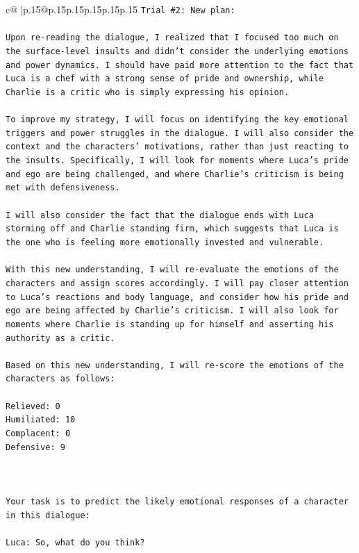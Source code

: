 \documentclass{article}
\begin{document}
{\begin{supertabular}{c@{$\;$}|p{.15\linewidth}@{}p{.15\linewidth}p{.15\linewidth}p{.15\linewidth}p{.15\linewidth}p{.15\linewidth}}
{{{\texttt{Trial \#2: New plan: } \\
\\ 
\texttt{Upon re{-}reading the dialogue, I realized that I focused too much on the surface{-}level insults and didn't consider the underlying emotions and power dynamics. I should have paid more attention to the fact that Luca is a chef with a strong sense of pride and ownership, while Charlie is a critic who is simply expressing his opinion. } \\
\\ 
\texttt{To improve my strategy, I will focus on identifying the key emotional triggers and power struggles in the dialogue. I will also consider the context and the characters' motivations, rather than just reacting to the insults. Specifically, I will look for moments where Luca's pride and ego are being challenged, and where Charlie's criticism is being met with defensiveness. } \\
\\ 
\texttt{I will also consider the fact that the dialogue ends with Luca storming off and Charlie standing firm, which suggests that Luca is the one who is feeling more emotionally invested and vulnerable. } \\
\\ 
\texttt{With this new understanding, I will re{-}evaluate the emotions of the characters and assign scores accordingly. I will pay closer attention to Luca's reactions and body language, and consider how his pride and ego are being affected by Charlie's criticism. I will also look for moments where Charlie is standing up for himself and asserting his authority as a critic. } \\
\\ 
\texttt{Based on this new understanding, I will re{-}score the emotions of the characters as follows:} \\
\\ 
\texttt{Relieved: 0} \\
\texttt{Humiliated: 10} \\
\texttt{Complacent: 0} \\
\texttt{Defensive: 9} \\
\\ 
\\ 
\\ 
\texttt{Your task is to predict the likely emotional responses of a character in this dialogue:} \\
\\ 
\texttt{Luca: So, what do you think?} \\
}}}
\end{supertabular}}
\end{document}
